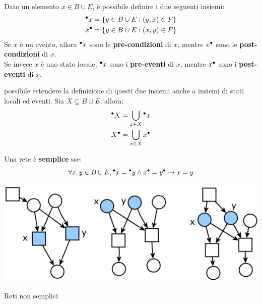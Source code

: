\begin{defn}
    Dato un elemento $x \in B \cup E$, è possibile definire i due seguenti
    insiemi:
    \begin{align*}
        {^\bullet}x &= \left\{y \in B \cup E : (y, x) \in F\right\}\\
        x^\bullet &= \left\{y \in B \cup E : (x, y) \in F\right\}
    \end{align*}
    Se $x$ è un evento, allora ${^\bullet}x$ sono le \textbf{pre-condizioni} di
    $x$, mentre $x^\bullet$ sono le \textbf{post-condizioni} di $x$.\\
    Se invece $x$ è uno stato locale, ${^\bullet}x$ sono i \textbf{pre-eventi}
    di $x$, mentre $x^\bullet$ sono i \textbf{post-eventi} di $x$.

    \upperAccE possibile estendere la definizione di questi due insiemi anche
    a insiemi di stati locali ed eventi. Sia $X \subseteq B \cup E$, allora:
    \begin{align*}
        {^\bullet}X &= \bigcup\limits_{x \in X} {^\bullet}x\\
        X^\bullet &= \bigcup\limits_{x \in X} x^\bullet
    \end{align*}
\end{defn}

\begin{defn}
    Una rete è \textbf{semplice} sse:
    \[
        \forall x, y \in B \cup E, {^\bullet}x = {^\bullet}y \land
        x^\bullet = y^\bullet \rightarrow x = y
    \]
    \begin{marginfigure}[-5cm]
        \includegraphics[width=1\linewidth]{img/reti_non_semplici.png}
        \caption{Reti non semplici}
        \label{fig:reti_non_semplici}
    \end{marginfigure}
\end{defn}

